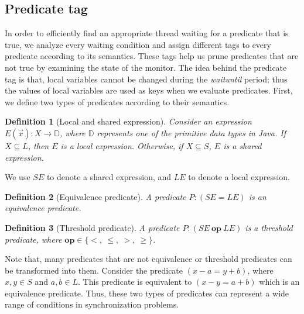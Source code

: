 \documentclass{sigplanconf}
\newtheorem{definition}{Definition}
\begin{document}
\subsection{Predicate tag} \label{sec:tag}
In order to efficiently find an appropriate thread waiting for a predicate that is
true, we analyze every waiting condition and assign different tags 
to every predicate according to its semantics. These  tags
help us prune predicates that are not true by examining the state 
of the monitor. The idea behind the predicate tag is that, local variables cannot be
changed during the {\em waituntil} period; thus the values of local variables are
used as keys when we evaluate predicates. 
First, we define two types of 
predicates according to their semantics. 
\begin{definition}[Local and shared expression]
    Consider an expression $E(\vec{x}): X \rightarrow \mathbb{D}$, where
    $\mathbb{D}$ represents one of the primitive data types in Java. If $X
    \subseteq L$, then $E$ is a local expression. Otherwise, 
    if $X \subseteq S$, $E$ is a shared expression.  
\end{definition}
We use $SE$ to denote a shared expression, and $LE$ to denote a local 
expression.

\begin{definition}[Equivalence predicate]
    A predicate $P: (SE = LE)$ is an equivalence predicate.
\end{definition}
\begin{definition}[Threshold predicate]
   A predicate $P: (SE\ \boldsymbol{op}\ LE)$ is a threshold predicate, where 
   $\boldsymbol{op}
    \in \{<,\ \le,\ >,\ \ge\}$.
    \end{definition}
Note that, many predicates that are not equivalence or threshold predicates can 
be transformed into them. Consider the predicate $(x - a = y + b)$, where 
$x, y \in S$ and $a,b \in L$. This predicate is equivalent to 
$(x - y = a + b)$ which is an equivalence predicate. Thus, these two types of 
predicates can represent a wide range of conditions in synchronization problems. 
\end{document}
